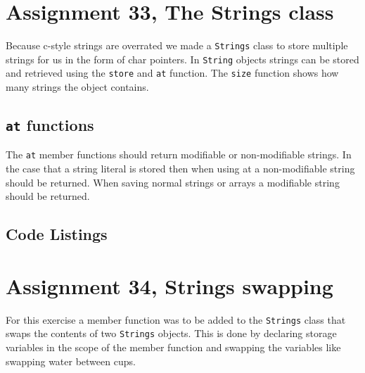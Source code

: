 \documentclass[11pt]{article}
\begin{document}
\section*{Assignment 33, The Strings class}
Because c-style strings are overrated we made a \texttt{Strings} class to store multiple strings for us in the form of char pointers.
In \texttt{String} objects strings can be stored and retrieved using the \texttt{store} and \texttt{at} function.
The \texttt{size} function shows how many strings the object contains.

\subsection*{\texttt{at} functions}
The \texttt{at} member functions should return modifiable or non-modifiable strings. In the case that a string literal is stored then when using at a non-modifiable string should be returned. When saving normal strings or arrays a modifiable string should be returned.

\subsection*{Code Listings}













\section*{Assignment 34, Strings swapping}
For this exercise a member function was to be added to the \texttt{Strings} class that swaps the contents of two \texttt{Strings} objects. This is done by declaring storage variables in the scope of the member function and swapping the variables like swapping water between cups.
\end{document}
